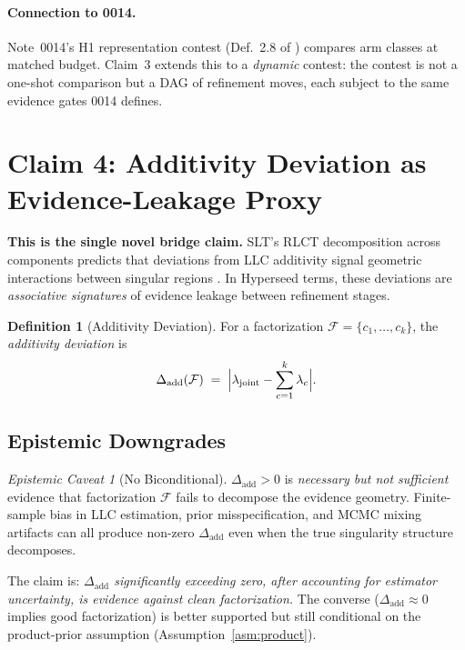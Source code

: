 \documentclass[11pt,a4paper]{article}
\theoremstyle{definition}
\newtheorem{definition}[theorem]{Definition}
\theoremstyle{remark}
\newtheorem{caveat}[theorem]{Epistemic Caveat}
\newcommand{\LLC}{\lambda}
\newcommand{\Dadd}{\Delta_{\mathrm{add}}}
\newcommand{\cF}{\mathcal{F}}
\begin{document}
\paragraph{Connection to 0014.}
Note~0014's H1 representation contest (Def.~2.8 of \cite{CausalFibres})
compares arm classes at matched budget.  Claim~3 extends this to a
\emph{dynamic} contest: the contest is not a one-shot comparison but a DAG of
refinement moves, each subject to the same evidence gates 0014 defines.

\section{Claim 4: Additivity Deviation as Evidence-Leakage Proxy}%
\label{sec:claim4}

\textbf{This is the single novel bridge claim.}  SLT's RLCT decomposition
across components predicts that deviations from LLC additivity signal geometric
interactions between singular regions \cite{InitSynth}.  In Hyperseed terms,
these deviations are \emph{associative signatures} of evidence leakage between
refinement stages.

\begin{definition}[Additivity Deviation]\label{def:Dadd}
  For a factorization $\cF = \{c_1, \ldots, c_k\}$, the \emph{additivity
  deviation} is
  \begin{equation}\label{eq:Dadd}
    \Dadd(\cF) \;=\;
      \Bigl|\LLC_{\mathrm{joint}}
            - \sum_{c=1}^{k} \LLC_c\Bigr|.
  \end{equation}
\end{definition}

\subsection{Epistemic Downgrades}

\begin{caveat}[No Biconditional]\label{cav:no-bicon}
  $\Dadd > 0$ is \emph{necessary but not sufficient} evidence that
  factorization $\cF$ fails to decompose the evidence geometry.  Finite-sample
  bias in LLC estimation, prior misspecification, and MCMC mixing artifacts can
  all produce non-zero $\Dadd$ even when the true singularity structure
  decomposes.

  The claim is: \emph{$\Dadd$ significantly exceeding zero, after accounting
  for estimator uncertainty, is evidence against clean factorization.}  The
  converse ($\Dadd \approx 0$ implies good factorization) is better supported
  but still conditional on the product-prior assumption
  (Assumption~\ref{asm:product}).
\end{caveat}
\end{document}
